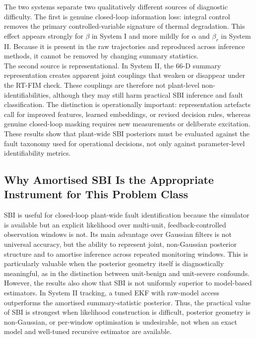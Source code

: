 \documentclass[aps,pre,twocolumn,superscriptaddress,floatfix]{revtex4-2}
\begin{document}
The two systems separate two qualitatively different sources of diagnostic 
difficulty. The first is genuine closed-loop information loss: integral control 
removes the primary controlled-variable signature of thermal degradation. This 
effect appears strongly for $\beta$ in System I and more mildly for $\alpha$
and $\beta_r$ in System II. Because it is present in the raw trajectories and
reproduced across inference methods, it cannot be removed by changing summary 
statistics.\\
The second source is representational. In System II, the 66-D summary representation 
creates apparent joint couplings that weaken or disappear under the RT-FIM check. 
These couplings are therefore not plant-level non-identifiabilities, although they 
may still harm practical SBI inference and fault classification. The distinction is 
operationally important: representation artefacts call for improved features, 
learned embeddings, or revised decision rules, whereas genuine closed-loop masking 
requires new measurements or deliberate excitation.\\
These results show that plant-wide SBI posteriors must be evaluated against the fault
 taxonomy used for operational decisions, not only against parameter-level identifiability metrics.

\subsection{Why Amortised SBI Is the Appropriate Instrument for This Problem Class}
\label{sec:disc_why_sbi}
SBI is useful for closed-loop plant-wide fault identification because the simulator
 is available but an explicit likelihood over multi-unit, feedback-controlled observation windows is not. Its main advantage
over Gaussian filters is not universal accuracy, but the ability to
represent joint, non-Gaussian posterior structure and to amortise
inference across repeated monitoring windows. This is particularly
valuable when the posterior geometry itself is diagnostically meaningful,
as in the distinction between unit-benign and unit-severe confounds.
However, the results also show that SBI is not uniformly superior to
model-based estimators. In System II tracking, a tuned EKF with raw-model
access outperforms the amortised summary-statistic posterior. Thus, the
practical value of SBI is strongest when likelihood construction is difficult,
posterior geometry is non-Gaussian, or per-window optimisation is
undesirable, not when an exact model and well-tuned recursive estimator are 
available.
\end{document}
